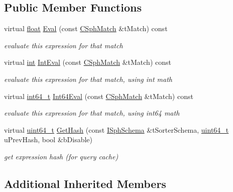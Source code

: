 \subsection*{Public Member Functions}
\begin{DoxyCompactItemize}
\item 
virtual \hyperlink{sphinxexpr_8cpp_a0e0d0739f7035f18f949c2db2c6759ec}{float} \hyperlink{structExpr__GetId__c_ad6aa3560c3deada910ee8b497c95c745}{Eval} (const \hyperlink{classCSphMatch}{C\-Sph\-Match} \&t\-Match) const 
\begin{DoxyCompactList}\small\item\em evaluate this expression for that match \end{DoxyCompactList}\item 
virtual \hyperlink{sphinxexpr_8cpp_a4a26e8f9cb8b736e0c4cbf4d16de985e}{int} \hyperlink{structExpr__GetId__c_ac14ca6acedf1bf48cb7470d489f70f06}{Int\-Eval} (const \hyperlink{classCSphMatch}{C\-Sph\-Match} \&t\-Match) const 
\begin{DoxyCompactList}\small\item\em evaluate this expression for that match, using int math \end{DoxyCompactList}\item 
virtual \hyperlink{sphinxstd_8h_a996e72f71b11a5bb8b3b7b6936b1516d}{int64\-\_\-t} \hyperlink{structExpr__GetId__c_afe6b070f9ee2e75776690a2e8076bb43}{Int64\-Eval} (const \hyperlink{classCSphMatch}{C\-Sph\-Match} \&t\-Match) const 
\begin{DoxyCompactList}\small\item\em evaluate this expression for that match, using int64 math \end{DoxyCompactList}\item 
virtual \hyperlink{sphinxstd_8h_aaa5d1cd013383c889537491c3cfd9aad}{uint64\-\_\-t} \hyperlink{structExpr__GetId__c_adea086d328b9ea589955586b2d9e0cf2}{Get\-Hash} (const \hyperlink{classISphSchema}{I\-Sph\-Schema} \&t\-Sorter\-Schema, \hyperlink{sphinxstd_8h_aaa5d1cd013383c889537491c3cfd9aad}{uint64\-\_\-t} u\-Prev\-Hash, bool \&b\-Disable)
\begin{DoxyCompactList}\small\item\em get expression hash (for query cache) \end{DoxyCompactList}\end{DoxyCompactItemize}
\subsection*{Additional Inherited Members}


